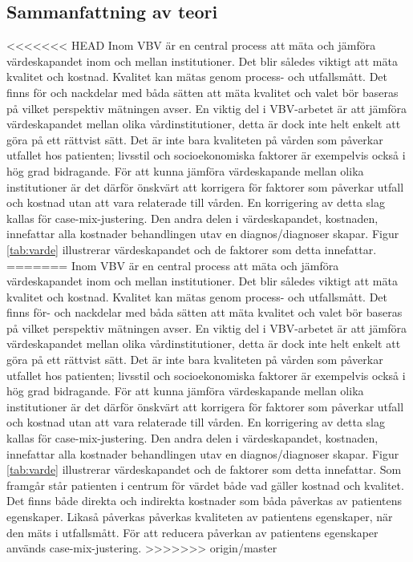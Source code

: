 \subsection{Sammanfattning av teori}

<<<<<<< HEAD
Inom VBV är en central process att mäta och jämföra värdeskapandet inom och mellan institutioner. Det blir således viktigt att mäta kvalitet och kostnad. Kvalitet kan mätas genom process- och utfallsmått. Det finns för och nackdelar med båda sätten att mäta kvalitet och valet bör baseras på vilket perspektiv mätningen avser. En viktig del i VBV-arbetet är att jämföra värdeskapandet mellan olika vårdinstitutioner, detta är dock inte helt enkelt att göra på ett rättvist sätt. Det är inte bara kvaliteten på vården som påverkar utfallet hos patienten; livsstil och socioekonomiska faktorer är exempelvis också i hög grad bidragande. För att kunna jämföra värdeskapande mellan olika institutioner är det därför önskvärt att korrigera för faktorer som påverkar utfall och kostnad utan att vara relaterade till vården. En korrigering av detta slag kallas för case-mix-justering. Den andra delen i värdeskapandet, kostnaden, innefattar alla kostnader behandlingen utav en diagnos/diagnoser skapar. Figur \ref{tab:varde} illustrerar värdeskapandet och de faktorer som detta innefattar.
=======
Inom VBV är en central process att mäta och jämföra värdeskapandet inom och mellan institutioner. Det blir således viktigt att mäta kvalitet och kostnad. Kvalitet kan mätas genom process- och utfallsmått. Det finns för- och nackdelar med båda sätten att mäta kvalitet och valet bör baseras på vilket perspektiv mätningen avser. En viktig del i VBV-arbetet är att jämföra värdeskapandet mellan olika vårdinstitutioner, detta är dock inte helt enkelt att göra på ett rättvist sätt. Det är inte bara kvaliteten på vården som påverkar utfallet hos patienten; livsstil och socioekonomiska faktorer är exempelvis också i hög grad bidragande. För att kunna jämföra värdeskapande mellan olika institutioner är det därför önskvärt att korrigera för faktorer som påverkar utfall och kostnad utan att vara relaterade till vården. En korrigering av detta slag kallas för case-mix-justering. Den andra delen i värdeskapandet, kostnaden, innefattar alla kostnader behandlingen utav en diagnos/diagnoser skapar. Figur \ref{tab:varde} illustrerar värdeskapandet och de faktorer som detta innefattar. Som framgår står patienten i centrum för värdet både vad gäller kostnad och kvalitet. Det finns både direkta och indirekta kostnader som båda påverkas av patientens egenskaper. Likaså påverkas påverkas kvaliteten av patientens egenskaper, när den mäts i utfallsmått. För att reducera påverkan av patientens egenskaper används case-mix-justering.
>>>>>>> origin/master

